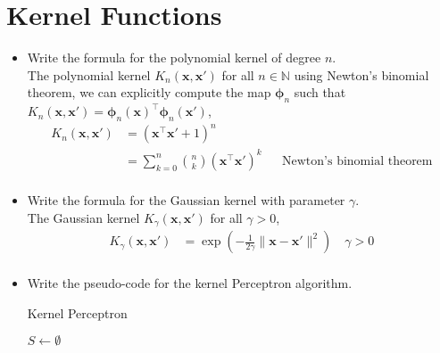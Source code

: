 \newpage
\section{Kernel Functions}

\begin{itemize}
    
    \item Write the formula for the polynomial kernel of degree $n$.\\ 

        The polynomial kernel $K_n(\boldsymbol{x}, \boldsymbol{x}')$ for all $n \in \mathbb{N}$ using Newton's binomial theorem, we can explicitly compute the map $\boldsymbol{\phi}_n$ such that $K_n(\boldsymbol{x}, \boldsymbol{x}') = \boldsymbol{\phi}_n(\boldsymbol{x})^\top \boldsymbol{\phi}_n(\boldsymbol{x}')$,
        \begin{align*}
            K_n(\boldsymbol{x}, \boldsymbol{x}') &= (\boldsymbol{x}^\top \boldsymbol{x}' + 1)^n \\
                                                 &= \sum_{k=0}^n \binom{n}{k} (\boldsymbol{x}^\top \boldsymbol{x}')^k && \text{Newton's binomial theorem} \\
        \end{align*}

    \item Write the formula for the Gaussian kernel with parameter $\gamma$.\\

        The Gaussian kernel $K_\gamma(\boldsymbol{x}, \boldsymbol{x}')$ for all $\gamma > 0$,
        \begin{align*}
            K_\gamma(\boldsymbol{x}, \boldsymbol{x}') &= \exp(-\frac{1}{2\gamma} \|\boldsymbol{x} - \boldsymbol{x}'\|^2) \quad \gamma > 0 \\
        \end{align*}


    \item Write the pseudo-code for the kernel Perceptron algorithm.\\


        \begin{algorithm}[H]
            \SetAlgoLined
            \DontPrintSemicolon
            \caption{Kernel Perceptron}
            $S \leftarrow \emptyset$ \\
        \end{algorithm}


\end{itemize}
